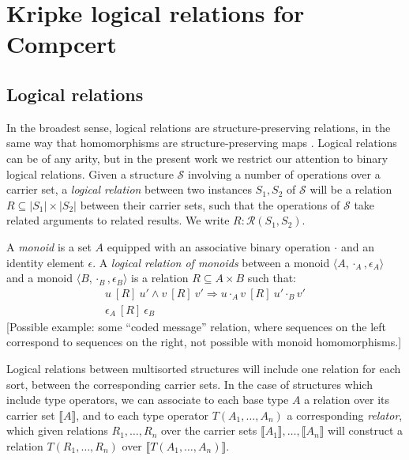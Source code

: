 \documentclass[acmsmall,anonymous]{acmart}
\newcommand{\ifr}[1]{\ [{#1}]\ }
\begin{document}

\section{Kripke logical relations for Compcert} %


\subsection{Logical relations} %

In the broadest sense,
logical relations are structure-preserving relations,
in the same way that homomorphisms are structure-preserving maps
\citep{lrp}.
Logical relations can be of any arity,
but in the present work
we restrict our attention to
binary logical relations.
Given a structure $\mathcal{S}$
involving a number of operations over a carrier set,
a \emph{logical relation}
between two instances $S_1, S_2$ of $\mathcal{S}$
will be a relation $R \subseteq |S_1| \times |S_2|$
between their carrier sets,
such that the operations of $\mathcal{S}$
take related arguments to related results.
We write $R : \mathcal{R}(S_1, S_2)$.

\begin{example}
\label{ex:monoid}
A \emph{monoid} is a set $A$ equipped with
an associative binary operation $\cdot$ and
an identity element $\epsilon$.
A \emph{logical relation of monoids} between
a monoid $\langle A, \cdot_A, \epsilon_A \rangle$ and
a monoid $\langle B, \cdot_B, \epsilon_B \rangle$
is a relation $R \subseteq A \times B$
such that:
\begin{gather*}
u \ifr{R} u' \wedge v \ifr{R} v' \Rightarrow u \cdot_A v \ifr{R} u' \cdot_B v' \\
\epsilon_A \ifr{R} \epsilon_B
\end{gather*}
[Possible example: some ``coded message'' relation,
where sequences on the left correspond to sequences on the right,
not possible with monoid homomorphisms.]
\end{example}

Logical relations between multisorted structures
will include one relation for each sort,
between the corresponding carrier sets.
In the case of structures which include type operators,
we can associate to each base type $A$
a relation over its carrier set $\llbracket A \rrbracket$,
and to each type operator $T(A_1, \ldots, A_n)$
a corresponding \emph{relator},
which given relations $R_1, \ldots, R_n$ over
the carrier sets $\llbracket A_1 \rrbracket, \ldots, \llbracket A_n \rrbracket$
will construct a relation $T(R_1, \ldots, R_n)$
over $\llbracket T(A_1, \ldots, A_n) \rrbracket$.
\end{document}
